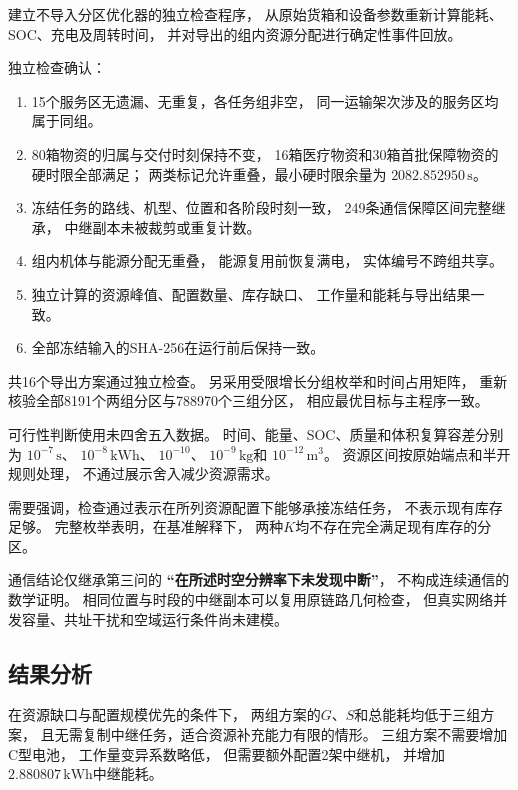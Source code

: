 \documentclass[bwprint]{gmcmthesis}
\begin{document}
建立不导入分区优化器的独立检查程序，
从原始货箱和设备参数重新计算能耗、SOC、充电及周转时间，
并对导出的组内资源分配进行确定性事件回放。

独立检查确认：

\begin{enumerate}
    \item 15个服务区无遗漏、无重复，各任务组非空，
    同一运输架次涉及的服务区均属于同组。

    \item 80箱物资的归属与交付时刻保持不变，
    16箱医疗物资和30箱首批保障物资的硬时限全部满足；
    两类标记允许重叠，最小硬时限余量为
    $2082.852950\,\mathrm{s}$。

    \item 冻结任务的路线、机型、位置和各阶段时刻一致，
    249条通信保障区间完整继承，
    中继副本未被裁剪或重复计数。

    \item 组内机体与能源分配无重叠，
    能源复用前恢复满电，
    实体编号不跨组共享。

    \item 独立计算的资源峰值、配置数量、库存缺口、
    工作量和能耗与导出结果一致。

    \item 全部冻结输入的SHA-256在运行前后保持一致。
\end{enumerate}

共16个导出方案通过独立检查。
另采用受限增长分组枚举和时间占用矩阵，
重新核验全部8191个两组分区与788970个三组分区，
相应最优目标与主程序一致。

可行性判断使用未四舍五入数据。
时间、能量、SOC、质量和体积复算容差分别为
$10^{-7}\,\mathrm{s}$、
$10^{-8}\,\mathrm{kWh}$、
$10^{-10}$、
$10^{-9}\,\mathrm{kg}$和
$10^{-12}\,\mathrm{m}^3$。
资源区间按原始端点和半开规则处理，
不通过展示舍入减少资源需求。

需要强调，检查通过表示在所列资源配置下能够承接冻结任务，
不表示现有库存足够。
完整枚举表明，在基准解释下，
两种$K$均不存在完全满足现有库存的分区。

通信结论仅继承第三问的
\textbf{“在所述时空分辨率下未发现中断”}，
不构成连续通信的数学证明。
相同位置与时段的中继副本可以复用原链路几何检查，
但真实网络并发容量、共址干扰和空域运行条件尚未建模。

\subsection{结果分析}

在资源缺口与配置规模优先的条件下，
两组方案的$G$、$S$和总能耗均低于三组方案，
且无需复制中继任务，适合资源补充能力有限的情形。
三组方案不需要增加C型电池，
工作量变异系数略低，
但需要额外配置2架中继机，
并增加$2.880807\,\mathrm{kWh}$中继能耗。
\end{document}
